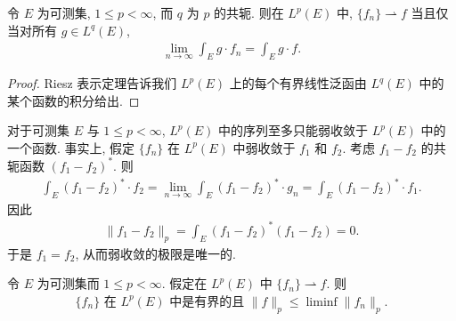 \documentclass[../../main.tex]{subfiles}
\begin{document}
\begin{proposition}\label{proposition:ch08-Lp弱收敛刻画}
令 $E$ 为可测集, $1\leqslant p<\infty$, 而 $q$ 为 $p$ 的共轭. 则在 $L^{p}(E)$ 中, $\{f_{n}\}\rightharpoonup f$ 当且仅当对所有 $g\in L^{q}(E)$,
\begin{align*}
\lim_{n\to\infty}\int_{E}g\cdot f_{n}=\int_{E}g\cdot f.
\end{align*}
\end{proposition}

\begin{proof}
Riesz 表示定理告诉我们 $L^{p}(E)$ 上的每个有界线性泛函由 $L^{q}(E)$ 中的某个函数的积分给出.
\end{proof}

对于可测集 $E$ 与 $1\leqslant p<\infty$, $L^{p}(E)$ 中的序列至多只能弱收敛于 $L^{p}(E)$ 中的一个函数. 事实上, 假定 $\{f_{n}\}$ 在 $L^{p}(E)$ 中弱收敛于 $f_{1}$ 和 $f_{2}$. 考虑 $f_{1}-f_{2}$ 的共轭函数 $(f_{1}-f_{2})^{*}$. 则
\begin{align*}
\int_{E}(f_{1}-f_{2})^{*}\cdot f_{2}=\lim_{n\to\infty}\int_{E}(f_{1}-f_{2})^{*}\cdot g_{n}=\int_{E}(f_{1}-f_{2})^{*}\cdot f_{1}.
\end{align*}
因此
\begin{align*}
\|f_{1}-f_{2}\|_{p}=\int_{E}(f_{1}-f_{2})^{*}(f_{1}-f_{2})=0.
\end{align*}
于是 $f_{1}=f_{2}$, 从而弱收敛的极限是唯一的.

\begin{theorem}\label{theorem:ch08-弱收敛有界}
令 $E$ 为可测集而 $1\leqslant p<\infty$. 假定在 $L^{p}(E)$ 中 $\{f_{n}\}\rightharpoonup f$. 则
\begin{align}
\{f_{n}\}\text{ 在 }L^{p}(E)\text{ 中是有界的且 }\|f\|_{p}\leqslant\liminf\|f_{n}\|_{p}.\label{align:ch08-弱收敛有界}
\end{align}
\end{theorem}
\end{document}
